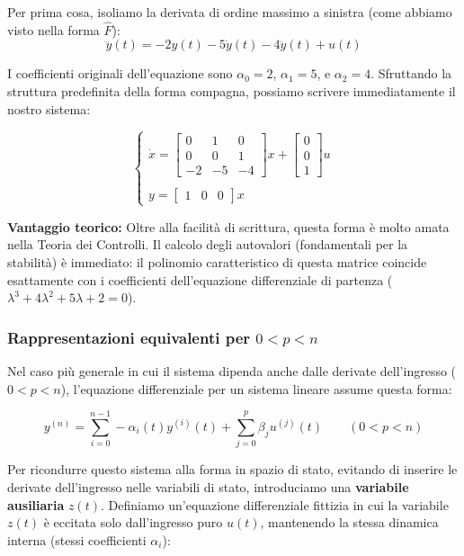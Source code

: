 \documentclass[a4paper,12pt]{article}
\begin{document}
	Per prima cosa, isoliamo la derivata di ordine massimo a sinistra (come abbiamo visto nella forma $\hat{F}$):
	\[
	\dddot{y}(t) = -2y(t) - 5\dot{y}(t) - 4\ddot{y}(t) + u(t)
	\]
	
	I coefficienti originali dell'equazione sono $\alpha_0 = 2$, $\alpha_1 = 5$, e $\alpha_2 = 4$. Sfruttando la struttura predefinita della forma compagna, possiamo scrivere immediatamente il nostro sistema:
	
	\[
	\begin{cases}
		\dot{x} = 
		\begin{bmatrix} 
			0 & 1 & 0 \\ 
			0 & 0 & 1 \\ 
			-2 & -5 & -4 
		\end{bmatrix} 
		x + 
		\begin{bmatrix} 
			0 \\ 
			0 \\ 
			1 
		\end{bmatrix} 
		u 
		\\
		\\
		y = 
		\begin{bmatrix} 
			1 & 0 & 0 
		\end{bmatrix} 
		x
	\end{cases}
	\]
	
	\textbf{Vantaggio teorico:} Oltre alla facilità di scrittura, questa forma è molto amata nella Teoria dei Controlli. Il calcolo degli autovalori (fondamentali per la stabilità) è immediato: il polinomio caratteristico di questa matrice coincide esattamente con i coefficienti dell'equazione differenziale di partenza ($\lambda^3 + 4\lambda^2 + 5\lambda + 2 = 0$).
	\subsubsection{Rappresentazioni equivalenti per $0 < p < n$}
	
	Nel caso più generale in cui il sistema dipenda anche dalle derivate dell'ingresso ($0 < p < n$), l'equazione differenziale per un sistema lineare assume questa forma:
	
	\[
	y^{(n)} = \sum_{i=0}^{n-1} -\alpha_i(t)y^{(i)}(t) + \sum_{j=0}^{p} \beta_j u^{(j)}(t) \qquad (0 < p < n)
	\]
	
	Per ricondurre questo sistema alla forma in spazio di stato, evitando di inserire le derivate dell'ingresso nelle variabili di stato, introduciamo una \textbf{variabile ausiliaria} $z(t)$. Definiamo un'equazione differenziale fittizia in cui la variabile $z(t)$ è eccitata solo dall'ingresso puro $u(t)$, mantenendo la stessa dinamica interna (stessi coefficienti $\alpha_i$):
	
\end{document}
